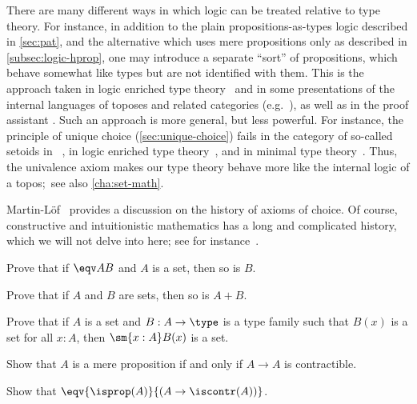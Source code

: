 There are many different ways in which logic can be treated relative to type theory.
For instance, in addition to the plain propositions-as-types logic described in \cref{sec:pat}, and the alternative which uses mere propositions only as described in \cref{subsec:logic-hprop}, one may introduce a separate ``sort'' of propositions, which behave somewhat like types but are not identified with them.
This is the approach taken in logic enriched type theory~\cite{aczel2002collection} and in some presentations of the internal languages of toposes and related categories (e.g.~\cite{jacobs1999categorical,elephant}), as well as in the proof assistant \Coq.
Such an approach is more general, but less powerful.
For instance, the principle of unique choice (\cref{sec:unique-choice}) fails in the category of so-called setoids in \Coq~\cite{Spiwack}, in logic enriched type theory~\cite{aczel2002collection}, and in minimal type theory~\cite{maietti2005toward}.
Thus, the univalence axiom makes our type theory behave more like the internal logic of a topos;~see also \cref{cha:set-math}.

Martin-L\"of~\cite{martin2006100} provides a discussion on the history of axioms of choice.
Of course, constructive and intuitionistic mathematics has a long and complicated history, which we will not delve into here; see for instance~\cite{TroelstraI,TroelstraII}.

\sectionExercises

\begin{ex}\label{ex:equiv-functor-set}
  Prove that if $\eqv A B$ and $A$ is a set, then so is $B$.
\end{ex}

\begin{ex}\label{ex:isset-coprod}
  Prove that if $A$ and $B$ are sets, then so is $A+B$.
\end{ex}

\begin{ex}\label{ex:isset-sigma}
  Prove that if $A$ is a set and $B:A\to \type$ is a type family such that $B(x)$ is a set for all $x:A$, then $\sm{x:A} B(x)$ is a set.
\end{ex}

\begin{ex}\label{ex:prop-endocontr}
  Show that $A$ is a mere proposition if and only if $A\to A$ is contractible.
\end{ex}

\begin{ex}\label{ex:prop-inhabcontr}
  Show that $\eqv{\isprop(A)}{(A\to\iscontr(A))}$.
\end{ex}

